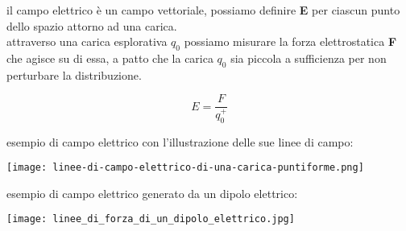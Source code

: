 \documentclass[a4paper,11pt]{article}
\begin{document}
il campo elettrico è un campo vettoriale, possiamo definire \textbf{E} per ciascun punto dello spazio attorno ad una carica.
\\
attraverso una carica esplorativa \(q_0\) possiamo misurare la forza elettrostatica \textbf{F} che agisce su di essa, a patto che la carica \(q_0\) sia piccola a sufficienza per non perturbare la distribuzione. 
\begin{center}
    \[
    E = \frac{F}{q_0^+}
    \]
\end{center}
esempio di campo elettrico con l'illustrazione delle sue linee di campo:
\begin{center}
    \texttt{[image: linee-di-campo-elettrico-di-una-carica-puntiforme.png]}
\end{center}
\pagebreak
esempio di campo elettrico generato da un dipolo elettrico:
\begin{center}
    \texttt{[image: linee\_di\_forza\_di\_un\_dipolo\_elettrico.jpg]}
\end{center}
\end{document}
